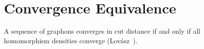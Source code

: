 


\section{Convergence Equivalence}

A sequence of graphons converges in cut distance if and only if all
homomorphism densities converge
(Lov\'asz~\cite[Theorem~11.5]{lovasz2012}).




